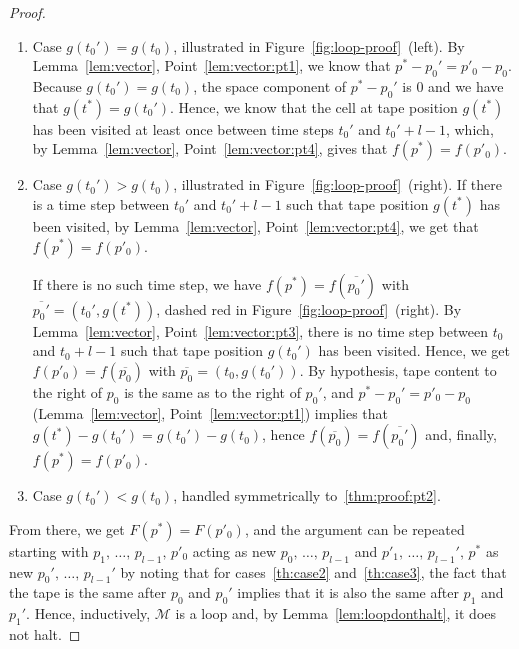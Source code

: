 \begin{proof}
    \begin{enumerate}
        \item Case $g(t_0') = g(t_0)$, illustrated in Figure~\ref{fig:loop-proof}~(left).  By Lemma~\ref{lem:vector}, Point~\ref{lem:vector:pt1}, we know that $p^*-p_0' = p'_0 - p_0$. Because $g(t_0') = g(t_0)$, the space component of $p^*-p_0'$ is 0 and we have that $g(t^*) = g(t_0')$. Hence, we know that the cell at tape position $g(t^*)$ has been visited at least once between time steps $t_0'$ and $t_0'+l-1$, which, by Lemma~\ref{lem:vector}, Point~\ref{lem:vector:pt4}, gives that $f(p^*) = f(p'_0)$.

        \item Case $g(t_0') > g(t_0)$, illustrated in Figure~\ref{fig:loop-proof}~(right). If there is a time step between $t_0'$ and $t_0'+l-1$ such that tape position $g(t^*)$ has been visited, by Lemma~\ref{lem:vector}, Point~\ref{lem:vector:pt4}, we get that $f(p^*) = f(p'_0)$.

              If there is no such time step, we have $f(p^*) = f(\overline{p_0'})$ with $\overline{p_0'} = (t_0',g(t^*))$, dashed red in Figure~\ref{fig:loop-proof}~(right). By Lemma~\ref{lem:vector}, Point~\ref{lem:vector:pt3}, there is no time step between $t_0$ and $t_0+l-1$ such that tape position $g(t_0')$ has been visited. Hence, we  get $f(p'_0) = f(\overline{p_0})$ with $\overline{p_0} = (t_0,g(t_0'))$. By hypothesis, tape content to the right of $p_0$ is the same as to the right of $p_0'$, and $p^*-p_0' = p'_0 - p_0$ (Lemma~\ref{lem:vector}, Point~\ref{lem:vector:pt1}) implies that $g(t^*)-g(t_0') = g(t_0') - g(t_0)$, hence $f(\overline{p_0}) = f(\overline{p_0'})$ and, finally, $f(p^*) = f(p'_0)$.\label{thm:proof:pt2}
        \item Case $g(t_0') < g(t_0)$, handled symmetrically to~\ref{thm:proof:pt2}.
    \end{enumerate}
    From there, we get $F(p^*) = F(p'_0)$, and the argument can be repeated starting with $p_1,\, \dots,\, p_{l-1},\, p'_0$ acting as new $p_0,\,\dots,\,p_{l-1}$ and $p'_1,\, \dots,\, p_{l-1}',\, p^*$ as new $p_0',\,\dots,\,p_{l-1}'$ by noting that for cases~\ref{th:case2} and~\ref{th:case3}, the fact that the tape is the same after $p_0$ and $p_0'$ implies that it is also the same after $p_1$ and $p_1'$. Hence, inductively, $\mathcal{M}$ is a loop and, by Lemma~\ref{lem:loopdonthalt}, it does not halt.
\end{proof}

